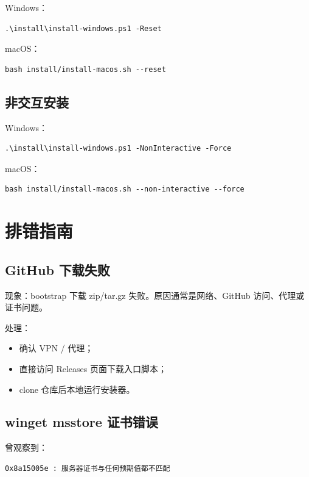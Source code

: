 \documentclass[11pt,a4paper]{ctexbook}
\begin{document}
Windows：

\begin{lstlisting}[language={}]
.\install\install-windows.ps1 -Reset
\end{lstlisting}

macOS：

\begin{lstlisting}[language={}]
bash install/install-macos.sh --reset
\end{lstlisting}

\section{非交互安装}

Windows：

\begin{lstlisting}[language={}]
.\install\install-windows.ps1 -NonInteractive -Force
\end{lstlisting}

macOS：

\begin{lstlisting}[language={}]
bash install/install-macos.sh --non-interactive --force
\end{lstlisting}

\chapter{排错指南}

\section{GitHub 下载失败}

现象：bootstrap 下载 zip/tar.gz 失败。原因通常是网络、GitHub 访问、代理或证书问题。

处理：

\begin{itemize}[leftmargin=2em]
  \item 确认 VPN / 代理；
  \item 直接访问 Releases 页面下载入口脚本；
  \item clone 仓库后本地运行安装器。
\end{itemize}

\section{winget msstore 证书错误}

曾观察到：

\begin{lstlisting}[language={}]
0x8a15005e : 服务器证书与任何预期值都不匹配
\end{lstlisting}
\end{document}
